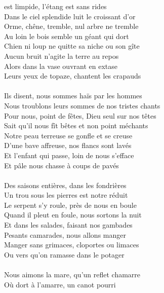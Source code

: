 
 est limpide, l'étang est sans rides
\\Dans le ciel splendide luit le croissant d'or
\\Orme, chêne, tremble, nul arbre ne tremble
\\Au loin le bois semble un géant qui dort
\\Chien ni loup ne quitte sa niche ou son gîte
\\Aucun bruit n'agite la terre au repos
\\Alors dans la vase ouvrant en extase
\\Leurs yeux de topaze, chantent les crapauds
\\\\Ils disent, nous sommes haïs par les hommes
\\Nous troublons leurs sommes de nos tristes chants
\\Pour nous, point de fêtes, Dieu seul sur nos têtes
\\Sait qu'il nous fît bêtes et non point méchants
\\Notre peau terreuse se gonfle et se creuse
\\D'une bave affreuse, nos flancs sont lavés
\\Et l'enfant qui passe, loin de nous s'efface
\\Et pâle nous chasse à coups de pavés
\\\\Des saisons entières, dans les fondrières
\\Un trou sous les pierres est notre réduit
\\Le serpent s'y roule, près de nous en boule
\\Quand il pleut en foule, nous sortons la nuit
\\Et dans les salades, faisant nos gambades
\\Pesants camarades, nous allons manger
\\Manger sans grimaces, cloportes ou limaces
\\Ou vers qu'on ramasse dans le potager
\\\\Nous aimons la mare, qu'un reflet chamarre
\\Où dort à l'amarre, un canot pourri
